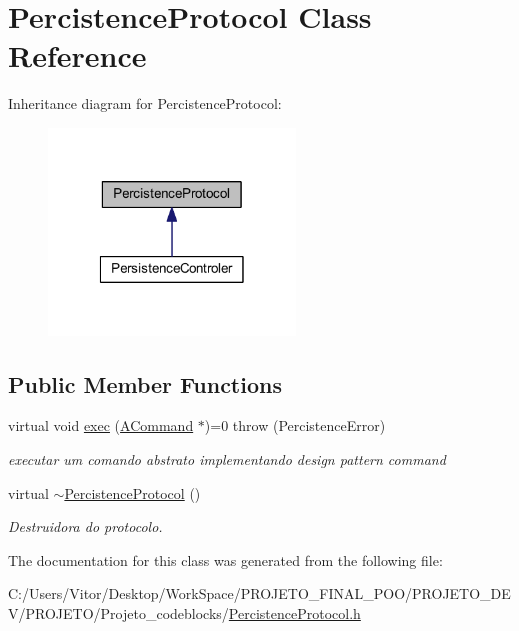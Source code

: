 \hypertarget{class_percistence_protocol}{\section{Percistence\-Protocol Class Reference}
\label{class_percistence_protocol}
}


Inheritance diagram for Percistence\-Protocol\-:\nopagebreak
\begin{figure}[H]
\begin{center}
\leavevmode
\includegraphics[width=186pt]{class_percistence_protocol__inherit__graph}
\end{center}
\end{figure}
\subsection*{Public Member Functions}
\begin{DoxyCompactItemize}
\item 
\hypertarget{class_percistence_protocol_aabb1342054dba836dfd026254dbffafb}{virtual void \hyperlink{class_percistence_protocol_aabb1342054dba836dfd026254dbffafb}{exec} (\hyperlink{class_a_command}{A\-Command} $\ast$)=0  throw (\-Percistence\-Error)}\label{class_percistence_protocol_aabb1342054dba836dfd026254dbffafb}

\begin{DoxyCompactList}\small\item\em executar um comando abstrato implementando design pattern command \end{DoxyCompactList}\item 
\hypertarget{class_percistence_protocol_ad68bcb2a3e256694b59cafa2fcf43606}{virtual \hyperlink{class_percistence_protocol_ad68bcb2a3e256694b59cafa2fcf43606}{$\sim$\-Percistence\-Protocol} ()}\label{class_percistence_protocol_ad68bcb2a3e256694b59cafa2fcf43606}

\begin{DoxyCompactList}\small\item\em Destruidora do protocolo. \end{DoxyCompactList}\end{DoxyCompactItemize}


The documentation for this class was generated from the following file\-:\begin{DoxyCompactItemize}
\item 
C\-:/\-Users/\-Vitor/\-Desktop/\-Work\-Space/\-P\-R\-O\-J\-E\-T\-O\-\_\-\-F\-I\-N\-A\-L\-\_\-\-P\-O\-O/\-P\-R\-O\-J\-E\-T\-O\-\_\-\-D\-E\-V/\-P\-R\-O\-J\-E\-T\-O/\-Projeto\-\_\-codeblocks/\hyperlink{_percistence_protocol_8h}{Percistence\-Protocol.\-h}\end{DoxyCompactItemize}
